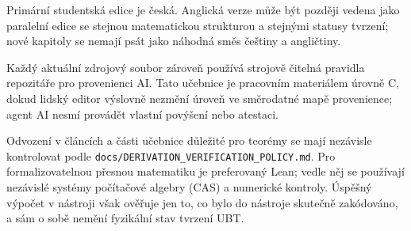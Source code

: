 Primární studentská edice je česká. Anglická verze může být později vedena jako
paralelní edice se stejnou matematickou strukturou a stejnými statusy tvrzení;
nové kapitoly se nemají psát jako náhodná směs češtiny a angličtiny.

Každý aktuální zdrojový soubor zároveň používá strojově čitelná pravidla
repozitáře pro provenienci AI. Tato učebnice je pracovním materiálem úrovně C,
dokud lidský editor výslovně nezmění úroveň ve směrodatné mapě provenience;
agent AI nesmí
provádět vlastní povýšení nebo atestaci.

Odvození v článcích a části učebnice důležité pro teorémy se mají nezávisle
kontrolovat podle \texttt{docs/DERIVATION\_VERIFICATION\_POLICY.md}. Pro
formalizovatelnou přesnou matematiku je preferovaný Lean; vedle něj se používají
nezávislé systémy počítačové algebry (CAS) a numerické kontroly. Úspěšný výpočet v nástroji však ověřuje jen
to, co bylo do nástroje skutečně zakódováno, a sám o sobě nemění fyzikální
stav tvrzení UBT.
